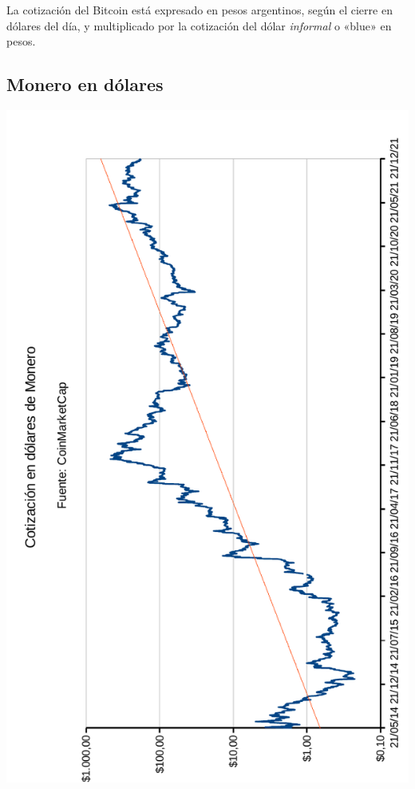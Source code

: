 \documentclass[12pt,a4paper,twoside]{book}
\begin{document}
La cotización del Bitcoin está expresado en pesos argentinos, según el cierre en dólares del día, y multiplicado por la cotización del dólar \textit{informal} o «blue» en pesos.



\newpage

\subsection{Monero en dólares}

\newpage

\begin{center}
\includegraphics[scale=0.975]{img/cot-monero.pdf}
\end{center}
\newpage




\end{document}
